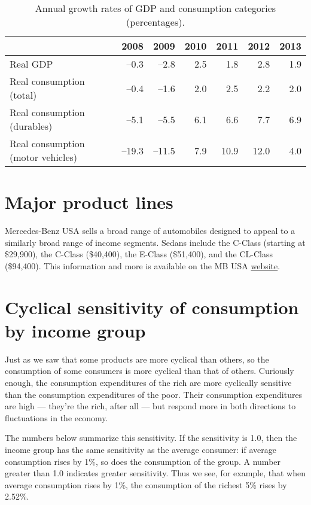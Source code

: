 \documentclass[letterpaper,12pt]{article}
\begin{document}
\begin{table}[h]
\begin{center}
\begin{tabular}{lrrrrrr}
\toprule
        & 2008 & 2009 & 2010 & 2011 & 2012 & 2013 \\

\midrule
Real GDP
        & --0.3 & --2.8 & 2.5 & 1.8 & 2.8 & 1.9\\
Real consumption (total)
        & --0.4 & --1.6 & 2.0 & 2.5 & 2.2 & 2.0 \\
Real consumption (durables)
        & --5.1 & --5.5 & 6.1 & 6.6 & 7.7 & 6.9 \\
Real consumption (motor vehicles)
        & --19.3 & --11.5& 7.9 & 10.9 & 12.0 & 4.0 \\
\bottomrule
\end{tabular}
\caption{Annual growth rates of GDP and consumption categories (percentages).}
\end{center}
\end{table}


\section{Major product lines}

Mercedes-Benz USA sells a broad range of automobiles
designed to appeal to a similarly broad range of income segments.
Sedans include the C-Class (starting at \$29,900),
the C-Class (\$40,400),
the E-Class (\$51,400), and the CL-Class (\$94,400).
This information and more is available on the
MB USA
\href{http://www.mbusa.com/}{website}.


\section{Cyclical sensitivity of consumption by income group}

Just as we saw that some products are more cyclical than others,
so the consumption of some consumers is more cyclical than that of others.
Curiously enough, the consumption expenditures of the rich are more
cyclically sensitive than the consumption expenditures of the poor.
Their consumption expenditures are high --- they're the rich, after all ---
but respond more
in both directions to fluctuations in the economy.

The numbers below summarize this sensitivity.
If the sensitivity is 1.0, then the income group has the same sensitivity
as the average consumer:
if average consumption rises by 1\%, so does the consumption of the group.
A number greater than 1.0 indicates greater sensitivity.
Thus we see, for example, that when average consumption
rises by 1\%,
the consumption of the richest 5\%  rises by 2.52\%.
\end{document}
